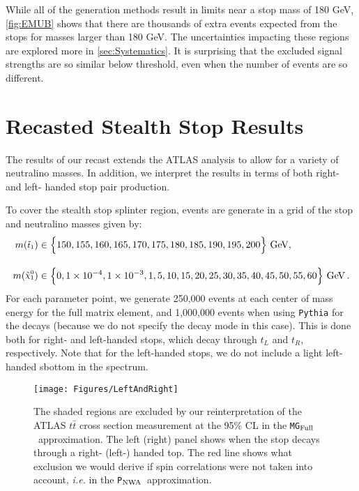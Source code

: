 \documentclass[a4paper,12pt]{article}
\newcommand{\gev}{~\text{GeV}}
\newcommand{\nn}{\nonumber \\ }
\newcommand{\pythia}{\texttt{P}$_{\rm{NWA}}$}
\newcommand{\mg}{\texttt{MG}$_{\rm{Full}}$}
\def\mnino{\ensuremath{m({\footnotesize \ninoone})}}
\def\mstop{\ensuremath{m({\footnotesize \stopone})}}
\def\stopone{\ensuremath{\mathchoice%
      {\displaystyle\raise.0ex\hbox{$\displaystyle\tilde t_1$}}%
         {\textstyle\raise-.2ex\hbox{$\textstyle\tilde t_1$}}%
       {\scriptstyle\raise.0ex\hbox{$\scriptstyle\tilde t_1$}}%
 {\scriptscriptstyle\raise.0ex\hbox{$\scriptscriptstyle\tilde t_1$}}}}
\def\ninoone{\ensuremath{\mathchoice%
      {\displaystyle\raise.4ex\hbox{$\displaystyle\tilde\chi^0_1$}}%
         {\textstyle\raise.1ex\hbox{$\textstyle\tilde\chi^0_1$}}%
       {\scriptstyle\raise.3ex\hbox{$\scriptstyle\tilde\chi^0_1$}}%
 {\scriptscriptstyle\raise.3ex\hbox{$\scriptscriptstyle\tilde\chi^0_1$}}}}
\begin{document}
While all of the generation methods result in limits near a stop mass of 180 GeV, \cref{fig:EMUB} shows that there are thousands of extra events expected from the stops for masses larger than 180 GeV. The uncertainties impacting these regions are explored more in \cref{sec:Systematics}. It is surprising that the excluded signal strengths are so similar below threshold, even when the number of events are so different.

\section{Recasted Stealth Stop Results}
\label{sec:recast}

The results of our recast extends the ATLAS analysis to allow for a variety of neutralino masses.  In addition, we interpret the results in terms of both right- and left- handed stop pair production.

To cover the stealth stop splinter region, events are generate in a grid of the stop and neutralino masses given by:
\begin{equation}
\begin{aligned}
\mstop &\in \Big\{150, 155, 160, 165, 170, 175, 180, 185, 190, 195, 200\Big\}\gev,  \\[10pt]
\mnino &\in \Big \{0, 1\times10^{-4}, 1\times10^{-3}, 1, 5, 10, 15, 20, 25, 30, 35, 40, 45, 50, 55, 60\Big\} \gev \, . \nn
\end{aligned}
\end{equation}
For each parameter point, we generate 250,000 events at each center of mass energy for the full matrix element, and 1,000,000 events when using \texttt{Pythia} for the decays (because we do not specify the decay mode in this case). This is done both for right- and left-handed stops, which decay through $t_L$ and $t_R$, respectively.  Note that for the left-handed stops, we do not include a light left-handed sbottom in the spectrum.

\begin{figure}[htbp]
\begin{center}
\texttt{[image: Figures/LeftAndRight]}
\caption{The shaded regions are excluded by our reinterpretation of the ATLAS $t\bar{t}$  cross section measurement at the 95\% CL in the \mg\ approximation. The left (right) panel shows when the stop decays through a right- (left-) handed top. The red line shows what exclusion we would derive if spin correlations were not taken into account, \emph{i.e.} in the \pythia\ approximation.}
\label{fig:LeftRight}
\end{center}
\end{figure}
\end{document}
